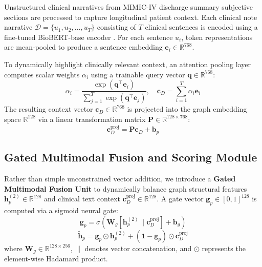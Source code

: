 \documentclass[11pt,a4paper]{article}
\begin{document}
Unstructured clinical narratives from MIMIC-IV discharge summary subjective sections are processed to capture longitudinal patient context. Each clinical note narrative $\mathcal{D} = \{u_1, u_2, \dots, u_T\}$ consisting of $T$ clinical sentences is encoded using a fine-tuned BioBERT-base encoder \cite{lee2020biobert}. For each sentence $u_i$, token representations are mean-pooled to produce a sentence embedding $\mathbf{e}_i \in \mathbb{R}^{768}$.

To dynamically highlight clinically relevant context, an attention pooling layer computes scalar weights $\alpha_i$ using a trainable query vector $\mathbf{q} \in \mathbb{R}^{768}$:
\begin{equation}
\alpha_i = \frac{\exp(\mathbf{q}^\top \mathbf{e}_i)}{\sum_{j=1}^T \exp(\mathbf{q}^\top \mathbf{e}_j)}, \quad \mathbf{c}_D = \sum_{i=1}^T \alpha_i \mathbf{e}_i
\label{eq:attention}
\end{equation}
The resulting context vector $\mathbf{c}_D \in \mathbb{R}^{768}$ is projected into the graph embedding space $\mathbb{R}^{128}$ via a linear transformation matrix $\mathbf{P} \in \mathbb{R}^{128 \times 768}$:
\begin{equation}
\mathbf{c}_D^{\text{proj}} = \mathbf{P} \mathbf{c}_D + \mathbf{b}_p
\end{equation}

\subsection{Gated Multimodal Fusion and Scoring Module}

Rather than simple unconstrained vector addition, we introduce a \textbf{Gated Multimodal Fusion Unit} to dynamically balance graph structural features $\mathbf{h}_p^{(2)} \in \mathbb{R}^{128}$ and clinical text context $\mathbf{c}_D^{\text{proj}} \in \mathbb{R}^{128}$. A gate vector $\mathbf{g}_p \in [0, 1]^{128}$ is computed via a sigmoid neural gate:
\begin{equation}
\mathbf{g}_p = \sigma \left( \mathbf{W}_g \left[ \mathbf{h}_p^{(2)} \parallel \mathbf{c}_D^{\text{proj}} \right] + \mathbf{b}_g \right)
\label{eq:gate}
\end{equation}
\begin{equation}
\tilde{\mathbf{h}}_p = \mathbf{g}_p \odot \mathbf{h}_p^{(2)} + (\mathbf{1} - \mathbf{g}_p) \odot \mathbf{c}_D^{\text{proj}}
\label{eq:fusion}
\end{equation}
where $\mathbf{W}_g \in \mathbb{R}^{128 \times 256}$, $\parallel$ denotes vector concatenation, and $\odot$ represents the element-wise Hadamard product.
\end{document}
